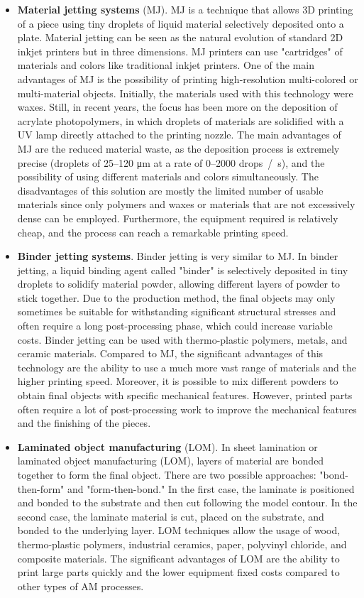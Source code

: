 \begin{itemize}
    \item \textbf{Material jetting systems} (MJ). MJ is a technique that allows 3D printing of a piece using tiny droplets of liquid material selectively deposited onto a plate. Material jetting can be seen as the natural evolution of standard 2D inkjet printers but in three dimensions. MJ printers can use "cartridges" of materials and colors like traditional inkjet printers. One of the main advantages of MJ is the possibility of printing high-resolution multi-colored or multi-material objects. Initially, the materials used with this technology were waxes. Still, in recent years, the focus has been more on the deposition of acrylate photopolymers, in which droplets of materials are solidified with a UV lamp directly attached to the printing nozzle. The main advantages of MJ are the reduced material waste, as the deposition process is extremely precise (droplets of \numrange{25}{120} \unit{\micro\meter} at a rate of \numrange{0}{2000} \unit{drops / \second}), and the possibility of using different materials and colors simultaneously. The disadvantages of this solution are mostly the limited number of usable materials since only polymers and waxes or materials that are not excessively dense can be employed. Furthermore, the equipment required is relatively cheap, and the process can reach a remarkable printing speed.
    \item \textbf{Binder jetting systems}. Binder jetting is very similar to MJ. In binder jetting, a liquid binding agent called "binder" is selectively deposited in tiny droplets to solidify material powder, allowing different layers of powder to stick together. Due to the production method, the final objects may only sometimes be suitable for withstanding significant structural stresses and often require a long post-processing phase, which could increase variable costs. Binder jetting can be used with thermo-plastic polymers, metals, and ceramic materials. Compared to MJ, the significant advantages of this technology are the ability to use a much more vast range of materials and the higher printing speed. Moreover, it is possible to mix different powders to obtain final objects with specific mechanical features. However, printed parts often require a lot of post-processing work to improve the mechanical features and the finishing of the pieces.
    \item \textbf{Laminated object manufacturing} (LOM). In sheet lamination or laminated object manufacturing (LOM), layers of material are bonded together to form the final object. There are two possible approaches: "bond-then-form" and "form-then-bond." In the first case, the laminate is positioned and bonded to the substrate and then cut following the model contour. In the second case, the laminate material is cut, placed on the substrate, and bonded to the underlying layer. LOM techniques allow the usage of wood, thermo-plastic polymers, industrial ceramics, paper, polyvinyl chloride, and composite materials. The significant advantages of LOM are the ability to print large parts quickly and the lower equipment fixed costs compared to other types of AM processes.

\end{itemize}
